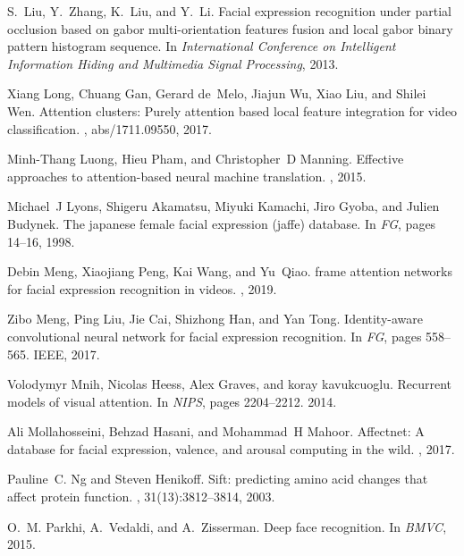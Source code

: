 \documentclass[journal]{IEEEtran}
\begin{document}
\begin{thebibliography}{10}
S.~Liu, Y.~Zhang, K.~Liu, and Y.~Li.
\newblock Facial expression recognition under partial occlusion based on gabor
multi-orientation features fusion and local gabor binary pattern histogram
sequence.
\newblock In {\em International Conference on Intelligent Information Hiding
	and Multimedia Signal Processing}, 2013.

Xiang Long, Chuang Gan, Gerard de~Melo, Jiajun Wu, Xiao Liu, and Shilei Wen.
\newblock Attention clusters: Purely attention based local feature integration
for video classification.
, abs/1711.09550, 2017.

Minh-Thang Luong, Hieu Pham, and Christopher~D Manning.
\newblock Effective approaches to attention-based neural machine translation.
, 2015.

Michael~J Lyons, Shigeru Akamatsu, Miyuki Kamachi, Jiro Gyoba, and Julien
Budynek.
\newblock The japanese female facial expression (jaffe) database.
\newblock In {\em FG}, pages 14--16, 1998.

Debin Meng, Xiaojiang Peng, Kai Wang, and Yu~Qiao.
\newblock frame attention networks for facial expression recognition in videos.
, 2019.

Zibo Meng, Ping Liu, Jie Cai, Shizhong Han, and Yan Tong.
\newblock Identity-aware convolutional neural network for facial expression
recognition.
\newblock In {\em FG}, pages 558--565. IEEE, 2017.

Volodymyr Mnih, Nicolas Heess, Alex Graves, and koray kavukcuoglu.
\newblock Recurrent models of visual attention.
\newblock In {\em NIPS}, pages 2204--2212. 2014.

Ali Mollahosseini, Behzad Hasani, and Mohammad~H Mahoor.
\newblock Affectnet: A database for facial expression, valence, and arousal
computing in the wild.
, 2017.

Pauline~C. Ng and Steven Henikoff.
\newblock Sift: predicting amino acid changes that affect protein function.
, 31(13):3812--3814, 2003.

O.~M. Parkhi, A.~Vedaldi, and A.~Zisserman.
\newblock Deep face recognition.
\newblock In {\em BMVC}, 2015.


\end{thebibliography}
\end{document}
